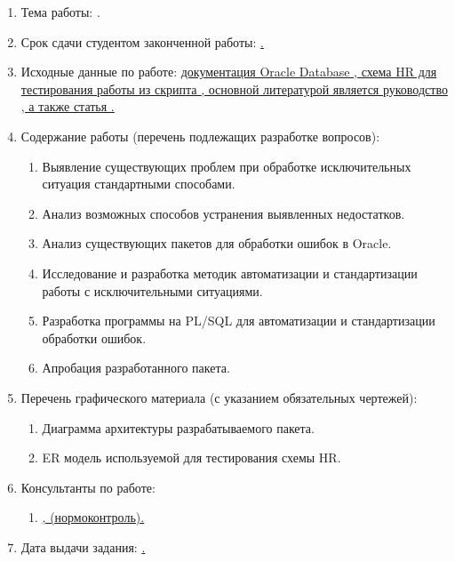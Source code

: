 \begin{enumerate}[1.]
	\item Тема работы: {\expandafter \ulined \thesisTitle.}
	\item Срок сдачи студентом законченной работы: \uline{\thesisDeadline.} 
	\item Исходные данные по работе: \uline{
		документация Oracle Database \cite{docOracleDB}, схема HR для тестирования работы из скрипта \cite{HrSchemaScript}, основной литературой является руководство \cite{ferstein}, а также статья \cite{handling-errors}.}%
	\printbibliographyTask %
	\item Содержание работы (перечень подлежащих разработке вопросов):
	\begin{enumerate}[label=\theenumi\arabic*.]
		\item Выявление существующих проблем при обработке исключительных ситуация стандартными способами.
		\item Анализ возможных способов устранения выявленных недостатков.
		\item Анализ существующих пакетов для обработки ошибок в Oracle.
		\item Исследование и разработка методик автоматизации и стандартизации работы с исключительными ситуациями.
		\item Разработка программы на PL/SQL для автоматизации и стандартизации обработки ошибок.
		\item Апробация разработанного пакета.
	\end{enumerate}
	\item Перечень графического материала (с указанием обязательных чертежей): 
	\begin{enumerate}[label=\theenumi\arabic*.]
		\item Диаграмма архитектуры разрабатываемого пакета.
		\item ER модель используемой для тестирования схемы HR.
	\end{enumerate}	
		\item Консультанты по работе:
		\begin{enumerate}[label=\theenumi\arabic*.] 
		\item \uline{\emakefirstuc{\ConsultantNormDegree}, \ConsultantNorm{} (нормоконтроль).} %
	\end{enumerate}
		\item Дата выдачи задания: \uline{\thesisStartDate.}
\end{enumerate}

